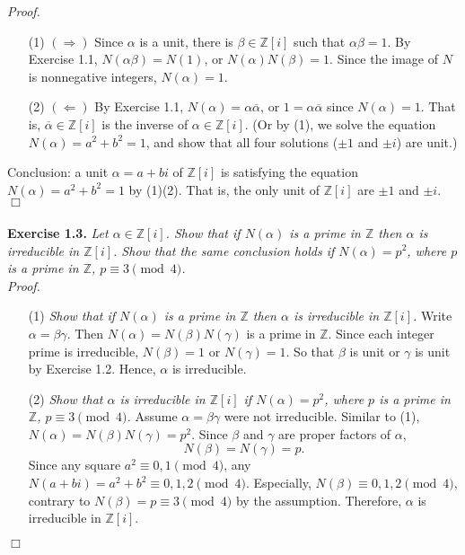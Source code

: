 \documentclass{article}
\begin{document}
\emph{Proof.}
\begin{enumerate}
\item[(1)]
\emph{$(\Longrightarrow)$}
Since $\alpha$ is a unit, there is $\beta \in \mathbb{Z}[i]$ such that
$\alpha \beta = 1$.
By Exercise 1.1, $N(\alpha \beta) = N(1)$, or $N(\alpha) N(\beta) = 1$.
Since the image of $N$ is nonnegative integers, $N(\alpha) = 1$.
\item[(2)]
\emph{$(\Longleftarrow)$}
By Exercise 1.1, $N(\alpha) = \alpha \overline{\alpha}$,
or $1 = \alpha \overline{\alpha}$ since $N(\alpha) = 1$.
That is, $\overline{\alpha} \in \mathbb{Z}[i]$ is
the inverse of $\alpha \in \mathbb{Z}[i]$.
(Or by (1), we solve the equation $N(\alpha) = a^2 + b^2 = 1$,
and show that all four solutions ($\pm 1$ and $\pm i$) are unit.)
\end{enumerate}
Conclusion: a unit $\alpha = a+bi$ of $\mathbb{Z}[i]$
is satisfying the equation $N(\alpha) = a^2 + b^2 = 1$ by (1)(2).
That is, the only unit of $\mathbb{Z}[i]$ are $\pm 1$ and $\pm i$.
$\Box$ \\\\






\textbf{Exercise 1.3.}
\emph{Let $\alpha \in \mathbb{Z}[i]$.
Show that if $N(\alpha)$ is a prime in $\mathbb{Z}$ then
$\alpha$ is irreducible in $\mathbb{Z}[i]$.
Show that the same conclusion holds
if $N(\alpha) = p^2$, where $p$ is a prime in $\mathbb{Z}$,
$p \equiv 3 \pmod{4}$.} \\

\emph{Proof.}
\begin{enumerate}
\item[(1)]
\emph{Show that if $N(\alpha)$ is a prime in $\mathbb{Z}$ then
$\alpha$ is irreducible in $\mathbb{Z}[i]$.}
Write $\alpha = \beta\gamma$.
Then $N(\alpha) = N(\beta)N(\gamma)$ is a prime in $\mathbb{Z}$.
Since each integer prime is irreducible, $N(\beta) = 1$ or $N(\gamma) = 1$.
So that $\beta$ is unit or $\gamma$ is unit by Exercise 1.2.
Hence, $\alpha$ is irreducible.
\item[(2)]
\emph{Show that $\alpha$ is irreducible in $\mathbb{Z}[i]$
if $N(\alpha) = p^2$, where $p$ is a prime in $\mathbb{Z}$,
$p \equiv 3 \pmod{4}$.}
Assume $\alpha = \beta\gamma$ were not irreducible.
Similar to (1), $N(\alpha) = N(\beta)N(\gamma) = p^2$.
Since $\beta$ and $\gamma$ are proper factors of $\alpha$,
$$N(\beta) = N(\gamma) = p.$$
Since any square $a^2 \equiv 0, 1 \pmod{4}$,
any $N(a+bi) = a^2+b^2 \equiv 0, 1, 2 \pmod{4}$.
Especially, $N(\beta) \equiv 0, 1, 2 \pmod{4}$,
contrary to $N(\beta) = p \equiv 3 \pmod{4}$
by the assumption.
Therefore, $\alpha$ is irreducible in $\mathbb{Z}[i]$.
\end{enumerate}
$\Box$ \\
\end{document}
